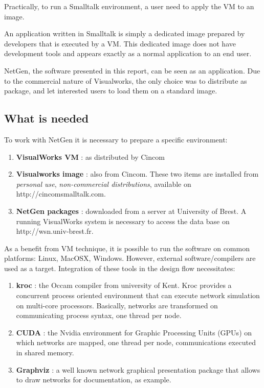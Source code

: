 \documentclass[times,a4paper]{book}
\begin{document}
Practically, to run a Smalltalk environment, a user need to apply the VM to an image.

An application written in Smalltalk is simply a dedicated image prepared by developers
that is executed by a VM. This dedicated image does not have development tools and
appears exactly as a normal application to an end user.

NetGen, the software presented in this report, can be seen as an application. Due to the
commercial nature of Visualworks, the only choice was to distribute as package, and let
interested users to load them on a standard image.

\subsection{What is needed}

To work with NetGen it is necessary to prepare a specific environment:

\begin{enumerate}
\item  {\bf VisualWorks VM} : as distributed by Cincom
\item  {\bf Visualworks image} : also from Cincom. These two items are installed 
from {\sl personal use}, {\sl non-commercial distributions},  available  on 
http://cincomsmalltalk.com.

\item  {\bf NetGen packages} : downloaded from a server at University of Brest.
A running VisualWorks system is necessary to access the data base
on http://wsn.univ-brest.fr.
\end{enumerate}

As a benefit from VM technique, it is possible to run the software on common 
platforms: Linux, MacOSX, Windows. However, external software/compilers  are used 
as a target. Integration of these tools in the design flow necessitates:

\begin{enumerate}
\item {\bf kroc} : the Occam compiler from university of Kent. Kroc provides a concurrent
process oriented environment that can execute network simulation on multi-core processors.
Basically, networks are transformed on communicating process syntax, one thread per node.
\item {\bf CUDA} : the Nvidia environment for Graphic Processing Units (GPUs) on which
networks are mapped, one thread per node, communications executed in shared memory.
\item {\bf Graphviz} : a well known network graphical presentation package that allows to draw
networks for documentation, as example.
\end{enumerate}
\end{document}
